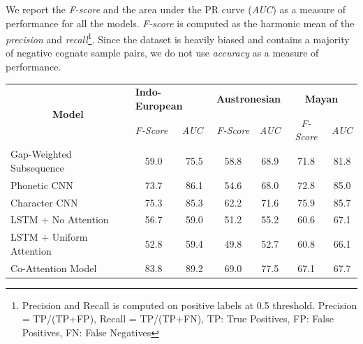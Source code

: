 \documentclass[11pt,letterpaper]{article}
\begin{document}
We report the \textit{F-score} and the area under the PR curve (\textit{AUC}) as a measure of performance for all the models. \textit{F-score} is computed as the harmonic mean of the \textit{precision} and \textit{recall}\footnote{Precision and Recall is computed on positive labels at 0.5 threshold. Precision = TP/(TP+FP), Recall = TP/(TP+FN), TP: True Positives, FP: False Positives, FN: False Negatives}. Since the dataset is heavily biased and contains a majority of negative cognate sample pairs, we do not use \textit{accuracy} as a measure of performance.

\begin{table}[t]
\centering

\begin{tabular}{lcccccc}
\multicolumn{1}{c}{\multirow{2}{*}{\textbf{Model}}} & \multicolumn{2}{l}{\textbf{Indo-European}}                              & \multicolumn{2}{c}{\textbf{Austronesian}} & \multicolumn{2}{c}{\textbf{Mayan}} \\ \cline{2-7} 
\multicolumn{1}{c}{}                                & \multicolumn{1}{l}{\textit{F-Score}} & \multicolumn{1}{l}{\textit{AUC}} & \textit{F-Score}      & \textit{AUC}      & \textit{F-Score}  & \textit{AUC}   \\ \hline 
Gap-Weighted Subsequence                            & 59.0                                 & 75.5                             & 58.8                  & 68.9              & 71.8              & 81.8           \\
Phonetic CNN                                        & 73.7                                 & 86.1                             & 54.6                  & 68.0              & 72.8              & 85.0           \\
Character CNN                                       & 75.3                                 & 85.3                             & 62.2                  & 71.6              & 75.9              & 85.7           \\
LSTM + No Attention                                 & 56.7                                 & 59.0                             & 51.2                  & 55.2              & 60.6              & 67.1           \\
LSTM + Uniform Attention                            & 52.8                                 & 59.4                             & 49.8                  & 52.7              & 60.8              & 66.1           \\ \hline
Co-Attention Model                                  & 83.8                                 & 89.2                             & 69.0                  & 77.5              & 67.1              & 67.7           \\

\end{tabular}
\end{table}
\end{document}
